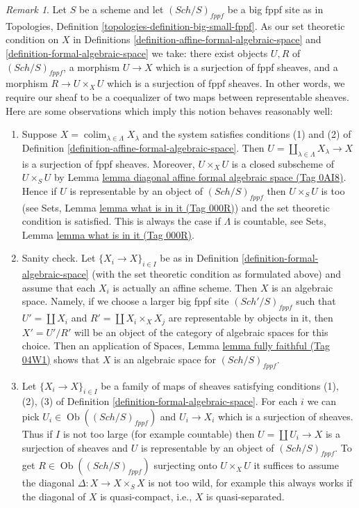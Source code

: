 \documentclass{amsart}
\theoremstyle{plain}
\theoremstyle{definition}
\theoremstyle{remark}
\newtheorem{remark}[subsection]{Remark}
\numberwithin{equation}{subsection}
\def\colim{\mathop{\mathrm{colim}}\nolimits}
\def\Sch{\mathit{Sch}}
\def\Ob{\mathop{\mathrm{Ob}}\nolimits}
\begin{document}
\begin{remark}
\label{remark-set-theoretic}
Let $S$ be a scheme and let $(\Sch/S)_{fppf}$ be a big fppf site as
in Topologies, Definition \ref{topologies-definition-big-small-fppf}.
As our set theoretic condition on $X$ in
Definitions \ref{definition-affine-formal-algebraic-space} and
\ref{definition-formal-algebraic-space} we take:
there exist objects $U, R$ of $(\Sch/S)_{fppf}$, a
morphism $U \to X$ which is a surjection of fppf sheaves, and
a morphism $R \to U \times_X U$ which is a surjection of fppf sheaves.
In other words, we require our sheaf to be a coequalizer of
two maps between representable sheaves.
Here are some observations which imply this notion behaves
reasonably well:
\begin{enumerate}
\item Suppose $X = \colim_{\lambda \in \Lambda} X_\lambda$
and the system satisfies conditions (1) and (2) of
Definition \ref{definition-affine-formal-algebraic-space}. Then
$U = \coprod_{\lambda \in \Lambda} X_\lambda \to X$ is a surjection
of fppf sheaves. Moreover, $U \times_X U$ is a closed subscheme
of $U \times_S U$ by Lemma \href{https://stacks.math.columbia.edu/tag/0AI8}{lemma diagonal affine formal algebraic space (Tag 0AI8)}.
Hence if $U$ is representable by an object of $(\Sch/S)_{fppf}$
then $U \times_S U$ is too (see Sets, Lemma \href{https://stacks.math.columbia.edu/tag/000R}{lemma what is in it (Tag 000R)})
and the set theoretic condition is satisfied. This is always the case
if $\Lambda$ is countable, see Sets, Lemma \href{https://stacks.math.columbia.edu/tag/000R}{lemma what is in it (Tag 000R)}.
\item Sanity check. Let $\{X_i \to X\}_{i \in I}$ be as in
Definition \ref{definition-formal-algebraic-space}
(with the set theoretic condition as formulated above)
and assume that each $X_i$ is actually an affine scheme.
Then $X$ is an algebraic space. Namely, if we choose a larger
big fppf site $(\Sch'/S)_{fppf}$ such that $U' = \coprod X_i$
and $R' = \coprod X_i \times_X X_j$ are representable by objects
in it, then $X' = U'/R'$ will be an object of the category
of algebraic spaces for this choice. Then an application of
Spaces, Lemma \href{https://stacks.math.columbia.edu/tag/04W1}{lemma fully faithful (Tag 04W1)} shows that
$X$ is an algebraic space for $(\Sch/S)_{fppf}$.
\item Let $\{X_i \to X\}_{i \in I}$ be a family of maps of sheaves
satisfying conditions (1), (2), (3) of
Definition \ref{definition-formal-algebraic-space}.
For each $i$ we can pick $U_i \in \Ob((\Sch/S)_{fppf})$
and $U_i \to X_i$ which is a surjection of sheaves.
Thus if $I$ is not too large (for example countable) then
$U = \coprod U_i \to X$ is a surjection of sheaves and
$U$ is representable by an object of $(\Sch/S)_{fppf}$.
To get $R \in \Ob((\Sch/S)_{fppf})$ surjecting onto $U \times_X U$
it suffices to assume the diagonal $\Delta : X \to X \times_S X$ is not
too wild, for example this always works if the diagonal of $X$ is
quasi-compact, i.e., $X$ is quasi-separated.
\end{enumerate}
\end{remark}
\end{document}
